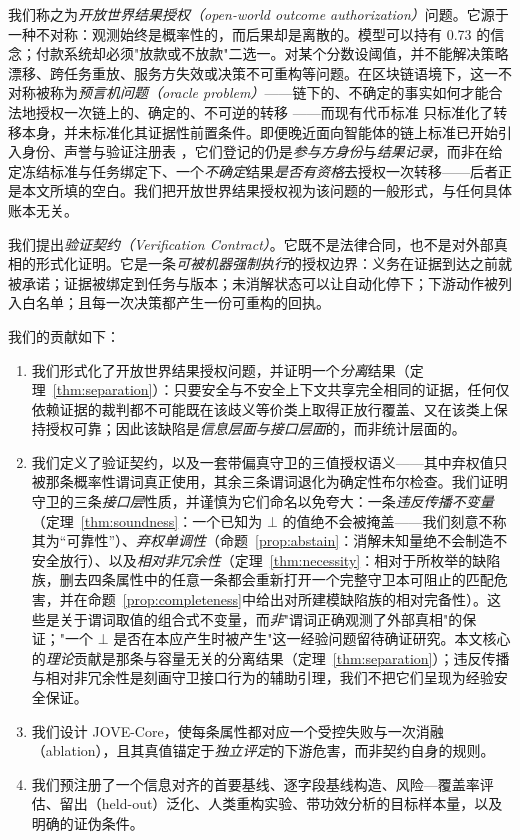 \documentclass[11pt]{ctexart}
\begin{document}
我们称之为\emph{开放世界结果授权（open-world outcome authorization）}问题。它源于一种不对称：观测始终是概率性的，而后果却是离散的。模型可以持有 0.73 的信念；付款系统却必须"放款或不放款"二选一。对某个分数设阈值，并不能解决策略漂移、跨任务重放、服务方失效或决策不可重构等问题。在区块链语境下，这一不对称被称为\emph{预言机问题（oracle problem）}——链下的、不确定的事实如何才能合法地授权一次链上的、确定的、不可逆的转移 \cite{caldarelli2020oracle,zhang2016towncrier,breidenbach2021chainlink}——而现有代币标准 \cite{vogelsteller2015erc20} 只标准化了转移本身，并未标准化其证据性前置条件。即便晚近面向智能体的链上标准已开始引入身份、声誉与验证注册表 \cite{ethereum2025erc8004}，它们登记的仍是\emph{参与方身份}与\emph{结果记录}，而非在给定冻结标准与任务绑定下、一个\emph{不确定}结果\emph{是否有资格}去授权一次转移——后者正是本文所填的空白。我们把开放世界结果授权视为该问题的一般形式，与任何具体账本无关。

我们提出\emph{验证契约（Verification Contract）}。它既不是法律合同，也不是对外部真相的形式化证明。它是一条\emph{可被机器强制执行}的授权边界：义务在证据到达之前就被承诺；证据被绑定到任务与版本；未消解状态可以让自动化停下；下游动作被列入白名单；且每一次决策都产生一份可重构的回执。

我们的贡献如下：
\begin{enumerate}
\item 我们形式化了开放世界结果授权问题，并证明一个\emph{分离}结果（定理~\ref{thm:separation}）：只要安全与不安全上下文共享完全相同的证据，任何仅依赖证据的裁判都不可能既在该歧义等价类上取得正放行覆盖、又在该类上保持授权可靠；因此该缺陷是\emph{信息层面与接口层面}的，而非统计层面的。
\item 我们定义了验证契约，以及一套带偏真守卫的三值授权语义——其中弃权值只被那条概率性谓词真正使用，其余三条谓词退化为确定性布尔检查。我们证明守卫的三条\emph{接口层}性质，并谨慎为它们命名以免夸大：一条\emph{违反传播不变量}（定理~\ref{thm:soundness}：一个已知为 $\bot$ 的值绝不会被掩盖——我们刻意不称其为“可靠性”）、\emph{弃权单调性}（命题~\ref{prop:abstain}：消解未知量绝不会制造不安全放行）、以及\emph{相对非冗余性}（定理~\ref{thm:necessity}：相对于所枚举的缺陷族，删去四条属性中的任意一条都会重新打开一个完整守卫本可阻止的匹配危害，并在命题~\ref{prop:completeness}中给出对所建模缺陷族的相对完备性）。这些是关于谓词取值的组合式不变量，而\emph{非}"谓词正确观测了外部真相"的保证；"一个 $\bot$ 是否在本应产生时被产生"这一经验问题留待确证研究。本文核心的\emph{理论}贡献是那条与容量无关的分离结果（定理~\ref{thm:separation}）；违反传播与相对非冗余性是刻画守卫接口行为的辅助引理，我们不把它们呈现为经验安全保证。
\item 我们设计 JOVE-Core，使每条属性都对应一个受控失败与一次消融（ablation），且其真值锚定于\emph{独立评定}的下游危害，而非契约自身的规则。
\item 我们预注册了一个信息对齐的首要基线、逐字段基线构造、风险—覆盖率评估、留出（held-out）泛化、人类重构实验、带功效分析的目标样本量，以及明确的证伪条件。
\end{enumerate}
\end{document}

